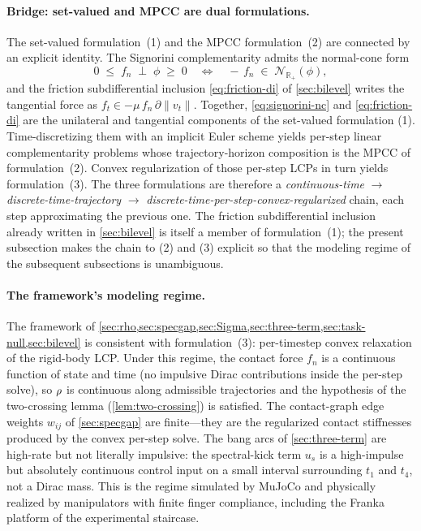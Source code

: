 \paragraph{Bridge: set-valued and MPCC are dual formulations.}
The set-valued formulation~(1) and the MPCC
formulation~(2) are connected by an explicit identity. The
Signorini complementarity admits the normal-cone form
\begin{equation}
\label{eq:signorini-nc}
  0 \;\le\; f_{n} \;\perp\; \phi \;\ge\; 0
  \quad\Longleftrightarrow\quad
  -\, f_{n} \;\in\; \mathcal{N}_{\mathbb{R}_{+}}(\phi),
\end{equation}
and the friction subdifferential inclusion \eqref{eq:friction-di}
of \cref{sec:bilevel} writes the tangential force as
$f_{t} \in -\mu\, f_{n}\, \partial \|v_{t}\|$. Together,
\eqref{eq:signorini-nc} and \eqref{eq:friction-di} are the
unilateral and tangential components of the set-valued formulation
(1). Time-discretizing them with an implicit Euler scheme yields
per-step linear complementarity problems whose
trajectory-horizon composition is the MPCC of formulation~(2).
Convex regularization of those per-step LCPs in turn yields
formulation~(3). The three formulations are therefore a
\emph{continuous-time} $\to$
\emph{discrete-time-trajectory} $\to$
\emph{discrete-time-per-step-convex-regularized} chain, each step
approximating the previous one. The friction subdifferential
inclusion already written in \cref{sec:bilevel} is itself a
member of formulation~(1); the present subsection makes the
chain to (2) and (3) explicit so that the modeling regime of the
subsequent subsections is unambiguous.

\paragraph{The framework's modeling regime.}
The framework of \cref{sec:rho,sec:specgap,sec:Sigma,sec:three-term,sec:task-null,sec:bilevel}
is consistent with formulation~(3): per-timestep convex
relaxation of the rigid-body LCP. Under this regime, the contact
force $f_{n}$ is a continuous function of state and time
(no impulsive Dirac contributions inside the per-step solve), so
$\rho$ is continuous along admissible trajectories and the
hypothesis of the two-crossing lemma (\cref{lem:two-crossing}) is
satisfied. The contact-graph edge weights $w_{ij}$ of
\cref{sec:specgap} are finite---they are the regularized contact
stiffnesses produced by the convex per-step solve. The bang arcs
of \cref{sec:three-term} are high-rate but not literally
impulsive: the spectral-kick term $u_{s}$ is a high-impulse but
absolutely continuous control input on a small interval
surrounding $t_{1}$ and $t_{4}$, not a Dirac mass. This is the
regime simulated by MuJoCo \citep{Todorov2014} and physically
realized by manipulators with finite finger compliance, including
the Franka platform of the experimental staircase.

